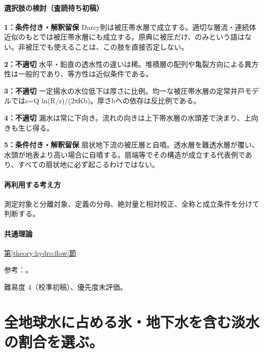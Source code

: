 \paragraph{選択肢の検討（査読待ち初稿）}\mbox{}\par

\noindent\textbf{1：条件付き・解釈留保} Darcy則は被圧帯水層で成立する。適切な層流・連続体近似のもとでは被圧帯水層にも成立する。原典に被圧だけ、のみという語はない。非被圧でも使えることは、この肢を直接否定しない。\par

\noindent\textbf{2：不適切} 水平・鉛直の透水性の違いは稀。堆積層の配列や亀裂方向による異方性は一般的であり、等方性は近似条件である。\par

\noindent\textbf{3：不適切} 一定揚水の水位低下は厚さに比例。均一な被圧帯水層の定常井戸モデルではs=\allowbreak{}Q ln(R/r)/(2πKb)。厚さbへの依存は反比例である。\par

\noindent\textbf{4：不適切} 漏水は常に下向き。流れの向きは上下帯水層の水頭差で決まり、上向きも生じ得る。\par

\noindent\textbf{5：条件付き・解釈留保} 扇状地下流の被圧層と自噴。透水層を難透水層が覆い、水頭が地表より高い場合に自噴する。扇端等でその構造が成立する代表例であり、すべての扇状地に必ず起こるわけではない。\par

\paragraph{再利用する考え方} 測定対象と分離対象、定義の分母、絶対量と相対校正、全称と成立条件を分けて判断する。

\paragraph{共通理論} \hyperref[theory:hydro:flow]{第\ref*{theory:hydro:flow}節}

\par 参考：\cite{analysis49_darcy_ref,inorganic_hydro_ref}。

\par 難易度 4（校準初稿）、優先度未評価。

\section{全地球水に占める氷・地下水を含む淡水の割合を選ぶ。}

